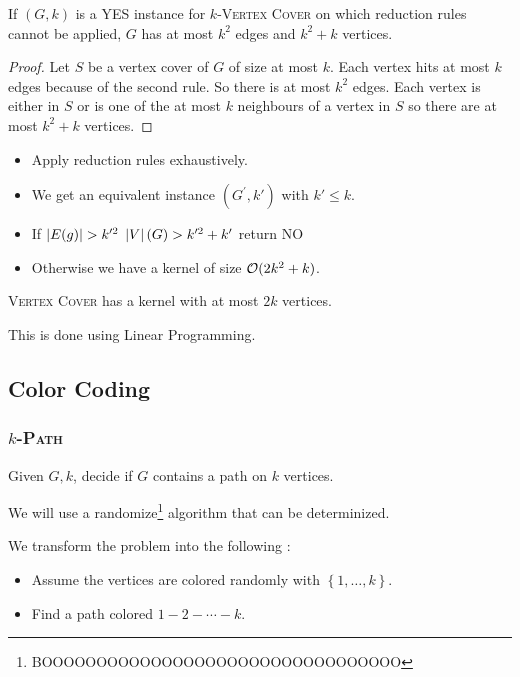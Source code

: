 \documentclass[12pt]{cours}
\begin{document}
\begin{lemma}
    If $(G, k)$ is a YES instance for $k$-\textsc{Vertex Cover} on which reduction rules cannot be applied, $G$ has at most $k^{2}$ edges and $k^{2} + k$ vertices.
\end{lemma}
\begin{proof}
    Let $S$ be a vertex cover of $G$ of size at most $k$. Each vertex hits at most $k$ edges because of the second rule. So there is at most $k^{2}$ edges. Each vertex is either in $S$ or is one of the at most $k$ neighbours of a vertex in $S$ so there are at most $k^{2} + k$ vertices. 
\end{proof}

\begin{proposition}
    \begin{itemize}
        \item Apply reduction rules exhaustively. 
        \item We get an equivalent instance $(G^{'}, k')$ with $k' \leq k$.
        \item If $\left|E(g)\right| > k'^{2}$ $\left|V\right|(G) > k'^{2} + k'$ return NO
        \item Otherwise we have a kernel of size $\mathcal{O}(2k^{2} + k)$.
    \end{itemize}
\end{proposition}

\begin{theorem}
    \textsc{Vertex Cover} has a kernel with at most $2k$ vertices. 
\end{theorem}
This is done using Linear Programming. 

\subsection{Color Coding}
\subsubsection{$k$-\textsc{Path}}
\begin{definition}
    Given $G, k$, decide if $G$ contains a path on $k$ vertices. 
\end{definition}

We will use a randomize\footnote{BOOOOOOOOOOOOOOOOOOOOOOOOOOOOOOOOO} algorithm that can be determinized.

We transform the problem into the following : 
\begin{itemize}
    \item Assume the vertices are colored randomly with $\left\{1, \ldots, k\right\}$. 
    \item Find a path colored $1 - 2 - \cdots - k$. 
\end{itemize}
\end{document}
